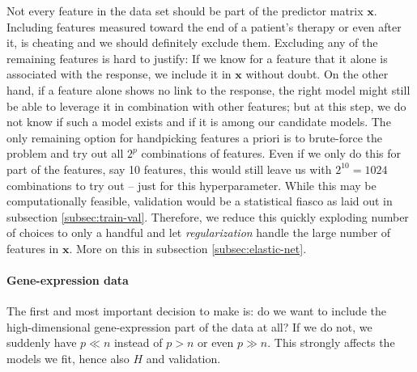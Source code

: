 Not every feature in the data set should be part of the predictor matrix $\mathbf{x}$. Including 
features measured toward the end of a patient's therapy or even after it, is cheating and we 
should definitely exclude them. Excluding any of the remaining features is hard to justify: If we 
know for a feature that it alone is associated with the response, we include it in $\mathbf{x}$ 
without doubt.
On the other hand, if a feature alone shows no link to the response, the right model might still be 
able to leverage it in combination with other features; but at this step, we do not know if such 
a model exists and if it is among our candidate models. The only remaining option for handpicking 
features a priori is to brute-force the problem and try out all $2^p$ combinations of features.
Even if we only do this for part of the features, say \num{10} features, this would still
leave us with $2^{10} = 1024$ combinations to try out -- just for this hyperparameter. While this 
may be computationally feasible, validation would be a statistical fiasco as laid out in subsection 
\ref{subsec:train-val}. Therefore, we reduce this quickly exploding number of choices to only 
a handful and let \textit{regularization} handle the large number of features in $\mathbf{x}$. More 
on this in subsection \ref{subsec:elastic-net}.

\paragraph{Gene-expression data}
The first and most important decision to make is: do we want to include the high-dimensional
gene-expression part of the data at all? If we do not, we suddenly have $p \ll n$ instead of 
$p > n$ or even $p \gg n$. This strongly affects the models we fit, hence also $H$ and 
validation.

